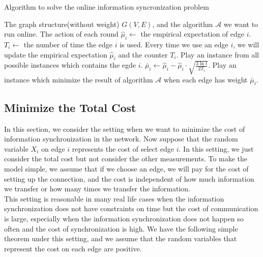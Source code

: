 \documentclass{article}
\theoremstyle{plain}
\theoremstyle{definition}
\theoremstyle{remark}
\begin{document}
    \begin{algorithm}
        \caption{Algorithm to solve the online information syncronization problem}
        \label{cucb}
        \begin{algorithmic}[1]
        \Require The graph structure(without weight) $G(V,E)$, and the algorithm $\mathcal A$ we want to run online.
        \Ensure The action of each round
            \State $\hat \mu_i \leftarrow$ the empirical expectation of edge $i$.
            \State $T_i \leftarrow$ the number of time the edge $i$ is used.
            \State Every time we use an edge $i$, we will update the empirical expectation $\hat \mu_i$ and the counter $T_i$.
                \State Play an instance from all possible instances which contains the egde $i$.
            \EndFor
                \State $\bar\mu_i \leftarrow \hat\mu_i - \hat\mu_i\cdot\sqrt{\frac{3\ln t}{2T_i}}$. 
                \State Play an instance which minimize the result of algorithm $\mathcal A$ when each edge has weight $\bar\mu_i$.
            \EndFor
        \EndProcedure
        \end{algorithmic}
    \end{algorithm}

    \subsection{Minimize the Total Cost}
    In this section, we consider the setting when we want to minimize the cost of information synchronization in the network. Now suppose that the random variable $X_i$ on edge $i$ represents the cost of select edge $i$. In this setting, we just consider the total cost but not consider the other measurements. To make the model simple, we assume that if we choose an edge, we will pay for the cost of setting up the connection, and the cost is independent of how much information we transfer or how many times we transfer the information.\\
    
    This setting is reasonable in many real life cases when the information synchronization does not have constraints on time but the cost of communication is large, especially when the information synchronization does not happen so often and the cost of synchronization is high. We have the following simple theorem under this setting, and we assume that the random variables that represent the cost on each edge are positive.\\
\end{document}
